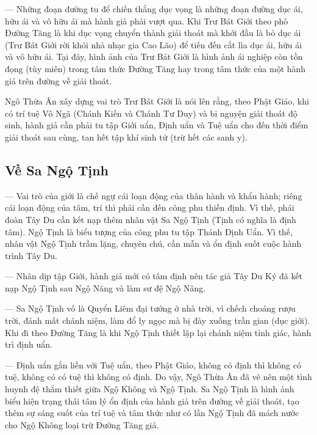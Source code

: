 — Những đoạn đường tu để chiến thắng dục vọng là những đoạn đường dục ái, hữu ái và vô hữu ái mà hành giả phải vượt qua. Khi Trư Bát Giới theo phò Đường Tăng là khi dục vọng chuyển thành giải thoát mà khởi đầu là bỏ dục ái (Trư Bát Giới rời khỏi nhà nhạc gia Cao Lão) để tiến đến cắt lìa dục ái, hữu ái và vô hữu ái. Tại đây, hình ảnh của Trư Bát Giới là hình ảnh ái nghiệp còn tồn đọng (tùy miên) trong tâm thức Đường Tăng hay trong tâm thức của một hành giả trên đường về giải thoát.

Ngô Thừa Ân xây dựng vai trò Trư Bát Giới là nói lên rằng, theo Phật Giáo, khi có trí tuệ Vô Ngã (Chánh Kiến và Chánh Tư Duy) và bi nguyện giải thoát độ sinh, hành giả cần phải tu tập Giới uẩn, Định uẩn và Tuệ uẩn cho đến thời điểm giải thoát sau cùng, tan hết tập khí sinh tử (trừ hết các sanh y).

\subsection{Về Sa Ngộ Tịnh} %
\label{sub:ve_sa_ngo_tinh}

— Vai trò của giới là chế ngự cái loạn động của thân hành và khẩu hành; riêng cái loạn động của tâm, trí thì phải cần đến công phu thiền định. Vì thế, phái đoàn Tây Du cần kết nạp thêm nhân vật Sa Ngộ Tịnh (Tịnh có nghĩa là định tâm). Ngộ Tịnh là biểu tượng của công phu tu tập Thánh Định Uẩn. Vì thế, nhân vật Ngộ Tịnh trầm lặng, chuyên chú, cần mẫn và ổn định suốt cuộc hành trình Tây Du.

— Nhân dịp tập Giới, hành giả mới có tâm định nên tác giả Tây Du Ký đã kết nạp Ngộ Tịnh sau Ngộ Năng và làm sư đệ Ngộ Năng.

— Sa Ngộ Tịnh vố là Quyển Liêm đại tướng ở nhà trời, vì chếch choáng rượu trời, đánh mất chánh niệm, làm đổ ly ngọc mà bị đày xuống trần gian (dục giới). Khi đi theo Đường Tăng là khi Ngộ Tịnh thiết lập lại chánh niệm tỉnh giác, hành trì định uẩn.

— Định uẩn gắn liền với Tuệ uẩn, theo Phật Giáo, không có định thì không có tuệ, không có có tuệ thì không có định. Do vậy, Ngô Thừa Ân đã vẽ nên một tình huynh đệ thắm thiết giữa Ngộ Không và Ngộ Tịnh. Sa Ngộ Tịnh là hình ảnh biểu hiện trạng thái tâm lý ổn định của hành giả trên đường về giải thoát, tạo thêm sự sáng suốt của trí tuệ và tâm thức như có lần Ngộ Tịnh đã mách nước cho Ngộ Không loại trừ Đường Tăng giả.


